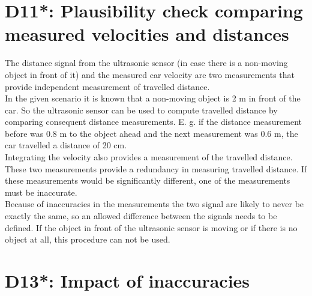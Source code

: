 \chapter{D11*: Plausibility check comparing measured velocities and distances}\label{cha:D11}
The distance signal from the ultrasonic sensor (in case there is a non-moving object in front of it) and the measured car velocity are two measurements that provide independent measurement of travelled distance.\\
In the given scenario it is known that a non-moving object is 2 m in front of the car. So the ultrasonic sensor can be used to compute travelled distance by comparing consequent distance measurements. E. g. if the distance measurement before was 0.8 m to the object ahead and the next measurement was 0.6 m, the car travelled a distance of 20 cm.\\
Integrating the velocity also provides a measurement of the travelled distance. These two measurements provide a redundancy in measuring travelled distance. If these measurements would be significantly different, one of the measurements must be inaccurate.\\
Because of inaccuracies in the measurements the two signal are likely to never be exactly the same, so an allowed difference between the signals needs to be defined.
If the object in front of the ultrasonic sensor is moving or if there is no object at all, this procedure can not be used.\\
\chapter{D13*: Impact of inaccuracies}\label{cha:D13}
